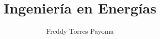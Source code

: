 \documentclass[11pt]{beamer}
\begin{document}
	\author{Freddy Torres Payoma}
	\title{Ingeniería en Energías}
	\begin{frame}[plain]
		\maketitle
	\end{frame}
	
	\begin{frame}
		\frametitle{}
	\end{frame}
\end{document}
